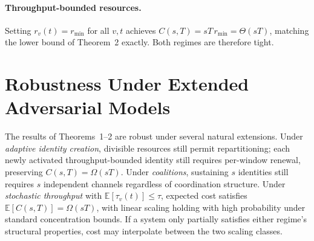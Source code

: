 \documentclass[journal]{IEEEtran}
\begin{document}
	\paragraph{Throughput-bounded resources.}
	Setting $r_v(t)=r_{\min}$ for all $v,t$ achieves
	$C(s,T)=sT\,r_{\min}=\Theta(sT)$,
	matching the lower bound of Theorem~2 exactly.
	Both regimes are therefore tight.
	\section{Robustness Under Extended Adversarial Models}
	
	The results of Theorems~1--2 are robust under several natural
	extensions.
	Under \emph{adaptive identity creation}, divisible resources
	still permit repartitioning; each newly activated throughput-bounded
	identity still requires per-window renewal, preserving
	$C(s,T)=\Omega(sT)$.
	Under \emph{coalitions}, sustaining $s$ identities still
	requires $s$ independent channels regardless of coordination
	structure.
	Under \emph{stochastic throughput} with
	$\mathbb{E}[\tau_v(t)]\le\tau$, expected cost satisfies
	$\mathbb{E}[C(s,T)]=\Omega(sT)$, with linear scaling
	holding with high probability under standard concentration bounds.
	If a system only partially satisfies either regime's structural
	properties, cost may interpolate between the two scaling classes.
	
	
	
	
\end{document}
